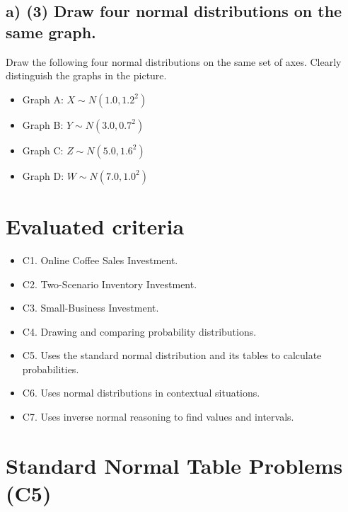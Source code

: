 	\subsection*{a) \textbf{(3)} Draw four normal distributions on the same graph.}
	\label{subsec:normal-vi-draw-four-normal-distributions-c4-a}
	Draw the following four normal distributions on the same set of axes. Clearly distinguish the graphs in the picture.
	\begin{itemize}
		\item Graph A: $X\sim N(1.0,1.2^2)$
		\item Graph B: $Y\sim N(3.0,0.7^2)$
		\item Graph C: $Z\sim N(5.0,1.6^2)$
		\item Graph D: $W\sim N(7.0,1.0^2)$
	\end{itemize}
	
	
	
	\section*{Evaluated criteria}
	\begin{itemize}
		\item C1. Online Coffee Sales Investment.
		\item C2. Two-Scenario Inventory Investment.
		\item C3. Small-Business Investment.
		\item C4. Drawing and comparing probability distributions.
		\item C5. Uses the standard normal distribution and its tables to calculate probabilities.
		\item C6. Uses normal distributions in contextual situations.
		\item C7. Uses inverse normal reasoning to find values and intervals.
	\end{itemize}
	
	
	\section{Standard Normal Table Problems (C5)}
	\label{sec:standard-normal-table-problems-c5}
	
